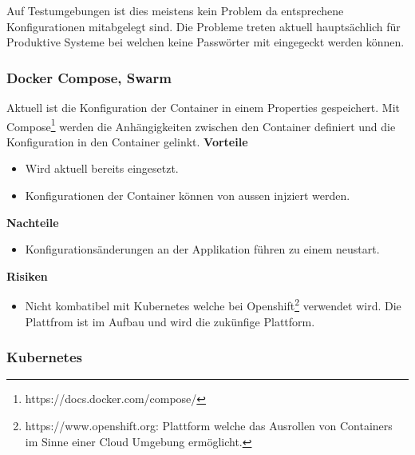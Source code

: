 Auf Testumgebungen ist dies meistens kein Problem da entsprechene Konfigurationen mitabgelegt sind. Die Probleme treten aktuell hauptsächlich für Produktive Systeme bei welchen keine Passwörter mit eingegeckt werden können.

\subsubsection{Docker Compose, Swarm}

Aktuell ist die Konfiguration der Container in einem Properties gespeichert. Mit Compose\footnote{https://docs.docker.com/compose/} werden die Anhängigkeiten zwischen den Container definiert und die Konfiguration in den Container gelinkt.\newline
\newline
\textbf{Vorteile}
\begin{itemize}
	\item Wird aktuell bereits eingesetzt.
	\item Konfigurationen der Container können von aussen injziert werden.
\end{itemize}
\textbf{Nachteile}
\begin{itemize}
	\item Konfigurationsänderungen an der Applikation führen zu einem neustart.
\end{itemize}
\textbf{Risiken}
\begin{itemize}
	\item Nicht kombatibel mit Kubernetes welche bei Openshift\footnote{https://www.openshift.org: Plattform welche das Ausrollen von Containers im Sinne einer Cloud Umgebung ermöglicht.}  verwendet wird. Die Plattfrom ist im Aufbau und wird die zukünfige Plattform.
\end{itemize}

\subsubsection{Kubernetes}

